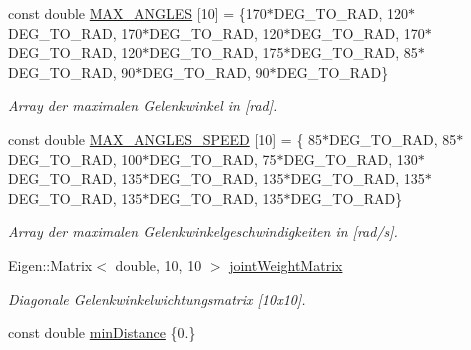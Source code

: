 \begin{DoxyCompactItemize}
\hypertarget{classNumericKinematic_a146737bc121dfecf585f5dd1012c6fb1}{const double \hyperlink{classNumericKinematic_a146737bc121dfecf585f5dd1012c6fb1}{M\-A\-X\-\_\-\-A\-N\-G\-L\-E\-S} \mbox{[}10\mbox{]} = \{170$\ast$D\-E\-G\-\_\-\-T\-O\-\_\-\-R\-A\-D, 120$\ast$D\-E\-G\-\_\-\-T\-O\-\_\-\-R\-A\-D, 170$\ast$D\-E\-G\-\_\-\-T\-O\-\_\-\-R\-A\-D, 120$\ast$D\-E\-G\-\_\-\-T\-O\-\_\-\-R\-A\-D, 170$\ast$D\-E\-G\-\_\-\-T\-O\-\_\-\-R\-A\-D, 120$\ast$D\-E\-G\-\_\-\-T\-O\-\_\-\-R\-A\-D, 175$\ast$D\-E\-G\-\_\-\-T\-O\-\_\-\-R\-A\-D, 85$\ast$D\-E\-G\-\_\-\-T\-O\-\_\-\-R\-A\-D, 90$\ast$D\-E\-G\-\_\-\-T\-O\-\_\-\-R\-A\-D, 90$\ast$D\-E\-G\-\_\-\-T\-O\-\_\-\-R\-A\-D\}}\label{classNumericKinematic_a146737bc121dfecf585f5dd1012c6fb1}

\begin{DoxyCompactList}\small\item\em Array der maximalen Gelenkwinkel in \mbox{[}rad\mbox{]}. \end{DoxyCompactList}\item 
\hypertarget{classNumericKinematic_a2773f8d9aafe634b8f1e7f52142f98e8}{const double \hyperlink{classNumericKinematic_a2773f8d9aafe634b8f1e7f52142f98e8}{M\-A\-X\-\_\-\-A\-N\-G\-L\-E\-S\-\_\-\-S\-P\-E\-E\-D} \mbox{[}10\mbox{]} = \{ 85$\ast$D\-E\-G\-\_\-\-T\-O\-\_\-\-R\-A\-D, 85$\ast$D\-E\-G\-\_\-\-T\-O\-\_\-\-R\-A\-D, 100$\ast$D\-E\-G\-\_\-\-T\-O\-\_\-\-R\-A\-D, 75$\ast$D\-E\-G\-\_\-\-T\-O\-\_\-\-R\-A\-D, 130$\ast$D\-E\-G\-\_\-\-T\-O\-\_\-\-R\-A\-D, 135$\ast$D\-E\-G\-\_\-\-T\-O\-\_\-\-R\-A\-D, 135$\ast$D\-E\-G\-\_\-\-T\-O\-\_\-\-R\-A\-D, 135$\ast$D\-E\-G\-\_\-\-T\-O\-\_\-\-R\-A\-D, 135$\ast$D\-E\-G\-\_\-\-T\-O\-\_\-\-R\-A\-D, 135$\ast$D\-E\-G\-\_\-\-T\-O\-\_\-\-R\-A\-D\}}\label{classNumericKinematic_a2773f8d9aafe634b8f1e7f52142f98e8}

\begin{DoxyCompactList}\small\item\em Array der maximalen Gelenkwinkelgeschwindigkeiten in \mbox{[}rad/s\mbox{]}. \end{DoxyCompactList}\item 
\hypertarget{classNumericKinematic_af1e1bf1f56436abba6d1d6582449600b}{Eigen\-::\-Matrix$<$ double, 10, 10 $>$ \hyperlink{classNumericKinematic_af1e1bf1f56436abba6d1d6582449600b}{joint\-Weight\-Matrix}}\label{classNumericKinematic_af1e1bf1f56436abba6d1d6582449600b}

\begin{DoxyCompactList}\small\item\em Diagonale Gelenkwinkelwichtungsmatrix \mbox{[}10x10\mbox{]}. \end{DoxyCompactList}\item 
\hypertarget{classNumericKinematic_aab2518847c6ad6c4a6cd33746ff4aec2}{const double \hyperlink{classNumericKinematic_aab2518847c6ad6c4a6cd33746ff4aec2}{min\-Distance} \{0.\}}\label{classNumericKinematic_aab2518847c6ad6c4a6cd33746ff4aec2}


\end{DoxyCompactItemize}
